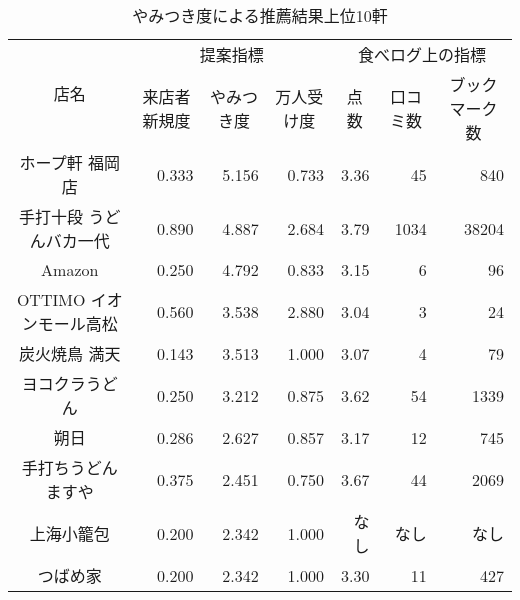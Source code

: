 \begin{table}[H]
\centering
\caption{やみつき度による推薦結果上位10軒}
\label{table:scrutiny:addictivity}
\small
\begin{tabular}{|c|r|r|r|r|r|r|}
\hline
\multirow{2}{*}{店名} & \multicolumn{3}{c|}{提案指標} & \multicolumn{3}{c|}{食べログ上の指標} \\ \cline{2-7}
 & \multicolumn{1}{c|}{来店者新規度} & \multicolumn{1}{c|}{やみつき度} & \multicolumn{1}{c|}{万人受け度} & \multicolumn{1}{c|}{点数} & \multicolumn{1}{c|}{口コミ数} & \multicolumn{1}{c|}{ブックマーク数} \\ \hline
ホープ軒 福岡店 & 0.333 & 5.156 & 0.733 & 3.36 & 45 & 840 \\ \hline
手打十段 うどんバカ一代 & 0.890 & 4.887 & 2.684 & 3.79 & 1034 & 38204 \\ \hline
Amazon & 0.250 & 4.792 & 0.833 & 3.15 & 6 & 96 \\ \hline
OTTIMO イオンモール高松 & 0.560 & 3.538 & 2.880 & 3.04 & 3 & 24 \\ \hline
炭火焼鳥 満天 & 0.143 & 3.513 & 1.000 & 3.07 & 4 & 79 \\ \hline
ヨコクラうどん & 0.250 & 3.212 & 0.875 & 3.62 & 54 & 1339 \\ \hline
朔日 & 0.286 & 2.627 & 0.857 & 3.17 & 12 & 745 \\ \hline
手打ちうどん ますや & 0.375 & 2.451 & 0.750 & 3.67 & 44 & 2069 \\ \hline
上海小籠包 & 0.200 & 2.342 & 1.000 & なし & なし & なし \\ \hline
つばめ家 & 0.200 & 2.342 & 1.000 & 3.30 & 11 & 427 \\ \hline
\end{tabular}
\end{table}
